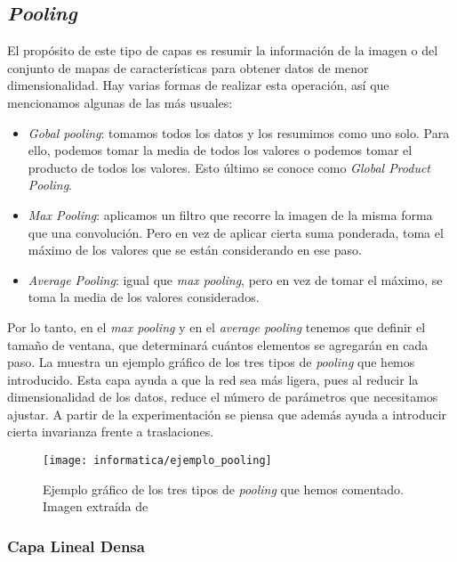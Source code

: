 \subsection{\textit{Pooling}}

El propósito de este tipo de capas es resumir la información de la imagen o del conjunto de mapas de características para obtener datos de menor dimensionalidad. Hay varias formas de realizar esta operación, así que mencionamos algunas de las más usuales:

\begin{itemize}
    \item \textit{Gobal pooling}: tomamos todos los datos y los resumimos como uno solo. Para ello, podemos tomar la media de todos los valores o podemos tomar el producto de todos los valores. Esto último se conoce como \textit{Global Product Pooling}.
    \item \textit{Max Pooling}: aplicamos un filtro que recorre la imagen de la misma forma que una convolución. Pero en vez de aplicar cierta suma ponderada, toma el máximo de los valores que se están considerando en ese paso.
    \item \textit{Average Pooling}: igual que \textit{max pooling}, pero en vez de tomar el máximo, se toma la media de los valores considerados.
\end{itemize}

Por lo tanto, en el \textit{max pooling} y en el \textit{average pooling} tenemos que definir el tamaño de ventana, que determinará cuántos elementos se agregarán en cada paso. La  muestra un ejemplo gráfico de los tres tipos de \textit{pooling} que hemos introducido. Esta capa ayuda a que la red sea más ligera, pues al reducir la dimensionalidad de los datos, reduce el número de parámetros que necesitamos ajustar. A partir de la experimentación se piensa que además ayuda a introducir cierta invarianza frente a traslaciones.

\begin{figure}[!hbtp]
    \centering
    \texttt{[image: informatica/ejemplo\_pooling]}
    \caption{Ejemplo gráfico de los tres tipos de \textit{pooling} que hemos comentado. Imagen extraída de \cite{informatica:paper_definicion_cnn}}
    \label{img:ejemplos_pooling}
\end{figure}

\subsubsection{Capa Lineal Densa} \label{subsubs:capa_totalmente_conectada}

